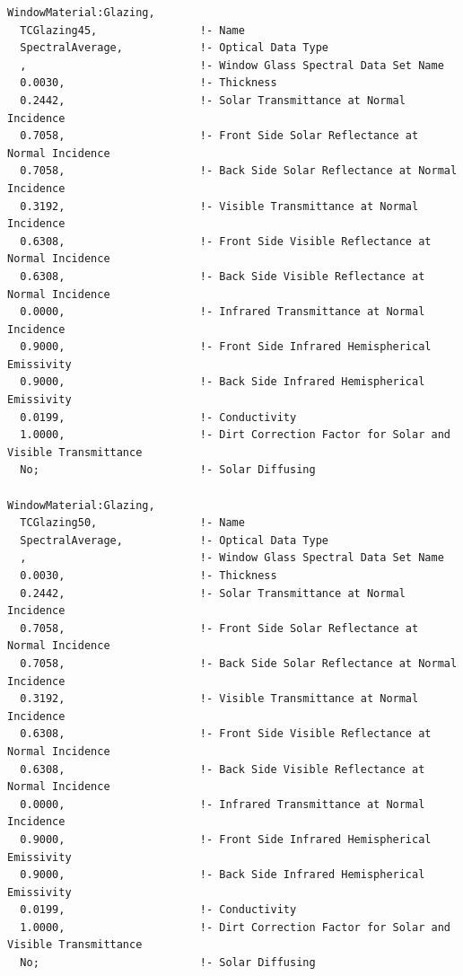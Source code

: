 \begin{lstlisting}
WindowMaterial:Glazing,
  TCGlazing45,                !- Name
  SpectralAverage,            !- Optical Data Type
  ,                           !- Window Glass Spectral Data Set Name
  0.0030,                     !- Thickness
  0.2442,                     !- Solar Transmittance at Normal Incidence
  0.7058,                     !- Front Side Solar Reflectance at Normal Incidence
  0.7058,                     !- Back Side Solar Reflectance at Normal Incidence
  0.3192,                     !- Visible Transmittance at Normal Incidence
  0.6308,                     !- Front Side Visible Reflectance at Normal Incidence
  0.6308,                     !- Back Side Visible Reflectance at Normal Incidence
  0.0000,                     !- Infrared Transmittance at Normal Incidence
  0.9000,                     !- Front Side Infrared Hemispherical Emissivity
  0.9000,                     !- Back Side Infrared Hemispherical Emissivity
  0.0199,                     !- Conductivity
  1.0000,                     !- Dirt Correction Factor for Solar and Visible Transmittance
  No;                         !- Solar Diffusing

WindowMaterial:Glazing,
  TCGlazing50,                !- Name
  SpectralAverage,            !- Optical Data Type
  ,                           !- Window Glass Spectral Data Set Name
  0.0030,                     !- Thickness
  0.2442,                     !- Solar Transmittance at Normal Incidence
  0.7058,                     !- Front Side Solar Reflectance at Normal Incidence
  0.7058,                     !- Back Side Solar Reflectance at Normal Incidence
  0.3192,                     !- Visible Transmittance at Normal Incidence
  0.6308,                     !- Front Side Visible Reflectance at Normal Incidence
  0.6308,                     !- Back Side Visible Reflectance at Normal Incidence
  0.0000,                     !- Infrared Transmittance at Normal Incidence
  0.9000,                     !- Front Side Infrared Hemispherical Emissivity
  0.9000,                     !- Back Side Infrared Hemispherical Emissivity
  0.0199,                     !- Conductivity
  1.0000,                     !- Dirt Correction Factor for Solar and Visible Transmittance
  No;                         !- Solar Diffusing


\end{lstlisting}
